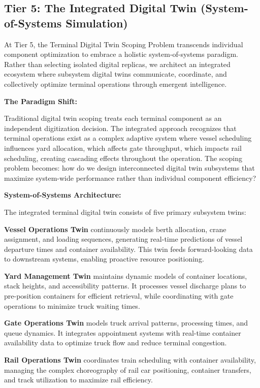 \documentclass{article}
\begin{document}
\subsection{Tier 5: The Integrated Digital Twin (System-of-Systems Simulation)}

At Tier 5, the Terminal Digital Twin Scoping Problem transcends individual component optimization to embrace a holistic system-of-systems paradigm. Rather than selecting isolated digital replicas, we architect an integrated ecosystem where subsystem digital twins communicate, coordinate, and collectively optimize terminal operations through emergent intelligence.

\textbf{The Paradigm Shift:}

Traditional digital twin scoping treats each terminal component as an independent digitization decision. The integrated approach recognizes that terminal operations exist as a complex adaptive system where vessel scheduling influences yard allocation, which affects gate throughput, which impacts rail scheduling, creating cascading effects throughout the operation. The scoping problem becomes: how do we design interconnected digital twin subsystems that maximize system-wide performance rather than individual component efficiency?

\textbf{System-of-Systems Architecture:}

The integrated terminal digital twin consists of five primary subsystem twins:

\textbf{Vessel Operations Twin} continuously models berth allocation, crane assignment, and loading sequences, generating real-time predictions of vessel departure times and container availability. This twin feeds forward-looking data to downstream systems, enabling proactive resource positioning.

\textbf{Yard Management Twin} maintains dynamic models of container locations, stack heights, and accessibility patterns. It processes vessel discharge plans to pre-position containers for efficient retrieval, while coordinating with gate operations to minimize truck waiting times.

\textbf{Gate Operations Twin} models truck arrival patterns, processing times, and queue dynamics. It integrates appointment systems with real-time container availability data to optimize truck flow and reduce terminal congestion.

\textbf{Rail Operations Twin} coordinates train scheduling with container availability, managing the complex choreography of rail car positioning, container transfers, and track utilization to maximize rail efficiency.
\end{document}
